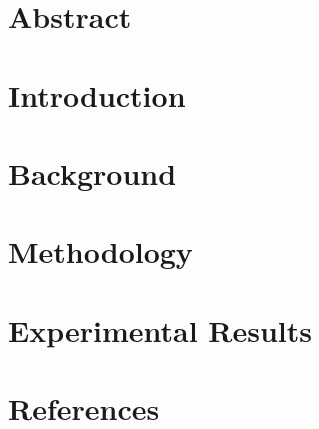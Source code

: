 \documentclass{report}
\begin{document}

\section{Abstract}

\section{Introduction}

\section{Background}

\section{Methodology}

\section{Experimental Results}

\section{References}
\end{document}

